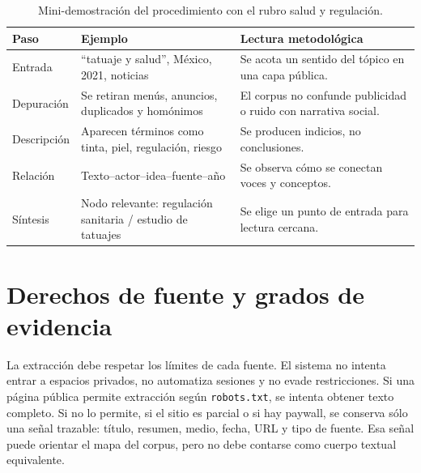 \documentclass[11pt]{article}
\begin{document}
\begin{table}[H]
\centering
\small
\begin{tabular}{L{0.18\textwidth}L{0.25\textwidth}L{0.42\textwidth}}
\toprule
\textbf{Paso} & \textbf{Ejemplo} & \textbf{Lectura metodológica} \\
\midrule
Entrada & ``tatuaje y salud'', México, 2021, noticias & Se acota un sentido del tópico en una capa pública. \\
Depuración & Se retiran menús, anuncios, duplicados y homónimos & El corpus no confunde publicidad o ruido con narrativa social. \\
Descripción & Aparecen términos como tinta, piel, regulación, riesgo & Se producen indicios, no conclusiones. \\
Relación & Texto--actor--idea--fuente--año & Se observa cómo se conectan voces y conceptos. \\
Síntesis & Nodo relevante: regulación sanitaria / estudio de tatuajes & Se elige un punto de entrada para lectura cercana. \\
\bottomrule
\end{tabular}
\caption{Mini-demostración del procedimiento con el rubro salud y regulación.}
\label{tab:mini-demo-es}
\end{table}

\section{Derechos de fuente y grados de evidencia}

La extracción debe respetar los límites de cada fuente. El sistema no intenta
entrar a espacios privados, no automatiza sesiones y no evade restricciones. Si
una página pública permite extracción según \texttt{robots.txt}, se intenta
obtener texto completo. Si no lo permite, si el sitio es parcial o si hay
paywall, se conserva sólo una señal trazable: título, resumen, medio, fecha,
URL y tipo de fuente. Esa señal puede orientar el mapa del corpus, pero no debe
contarse como cuerpo textual equivalente.
\end{document}
